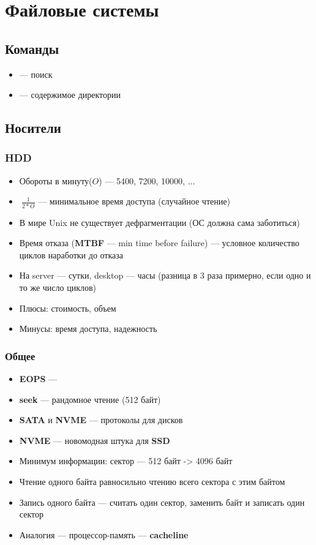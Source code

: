\documentclass[../lectures.tex]{subfiles}
\begin{document}
\chapter{Файловые системы}

\section{Команды}
\begin{itemize}
    \item {} --- поиск
    \item {} --- содержимое директории
\end{itemize}

\section{Носители}
\subsection{HDD}
\begin{itemize}
    \item Обороты в минуту($O$) --- 5400, 7200, 10000, ...
    \item $~\frac{1}{2 * O}$ --- минимальное время доступа (случайное чтение)
    \item В мире Unix не существует дефрагментации (ОС должна сама заботиться)
    \item Время отказа (\textbf{MTBF} --- min time before failure) --- условное 
          количество циклов наработки до отказа
    \item На server --- сутки, desktop --- часы (разница в 3 раза примерно, 
          если одно и то же число циклов)
    \item Плюсы: стоимость, объем
    \item Минусы: время доступа, надежность
\end{itemize}

\subsection{Общее}
\begin{itemize}
    \item \textbf{EOPS} --- \todo{}
    \item \textbf{seek} --- рандомное чтение (512 байт)
    \item \textbf{SATA} и \textbf{NVME} --- протоколы для дисков
    \item \textbf{NVME} --- новомодная штука для \textbf{SSD}
    \item Минимум информации: сектор --- 512 байт -> 4096 байт
    \item Чтение одного байта равносильно чтению всего сектора с этим байтом
    \item Запись одного байта --- считать один сектор, заменить байт и записать один сектор
    \item Аналогия --- процессор-память --- \textbf{cacheline}
\end{itemize}
\end{document}
